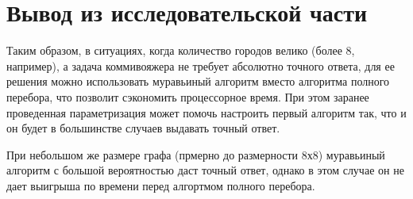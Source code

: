 \clearpage
\section{Вывод из исследовательской части}

Таким образом, в ситуациях, когда количество городов велико (более 8, например), а задача коммивояжера не требует абсолютно точного ответа, для ее решения можно использовать муравьиный алгоритм вместо алгоритма полного перебора, что позволит сэкономить процессорное время. При этом заранее проведенная параметризация может помочь настроить первый алгоритм так, что и он будет в большинстве случаев выдавать точный ответ. 

При небольшом же размере графа (прмерно до размерности 8х8) муравьиный алгоритм с большой вероятностью даст точный ответ, однако в этом случае он не дает выигрыша по времени перед алгортмом полного перебора.